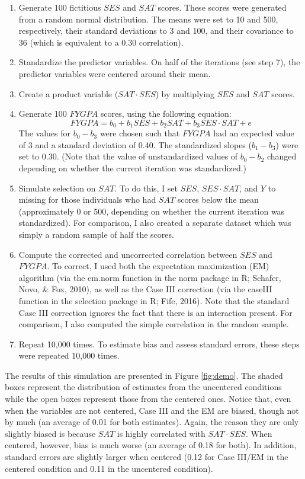 \documentclass[english,man]{apa6}
\providecommand{\tightlist}{%
  \setlength{\itemsep}{0pt}\setlength{\parskip}{0pt}}
\theoremstyle{definition}
\theoremstyle{definition}
\theoremstyle{remark}
\begin{document}
\begin{enumerate}
\def\labelenumi{(\arabic{enumi})}
\tightlist
\item
  Generate 100 fictitious \(SES\) and \(SAT\) scores. These scores were
  generated from a random normal distribution. The means were set to 10
  and 500, respectively, their standard deviations to 3 and 100, and
  their covariance to 36 (which is equivalent to a 0.30 correlation).
\item
  Standardize the predictor variables. On half of the iterations (see
  step 7), the predictor variables were centered around their mean.
\item
  Create a product variable (\(SAT\cdot SES\)) by multiplying \(SES\)
  and \(SAT\) scores.
\item
  Generate 100 \(FYGPA\) scores, using the following equation:
  \[ FYGPA = b_0 + b_1SES + b_2SAT + b_3SES\cdot SAT + e\] The values
  for \(b_0-b_3\) were chosen such that \(FYGPA\) had an expected value
  of 3 and a standard deviation of 0.40. The standardized slopes
  (\(b_1-b_3\)) were set to 0.30. (Note that the value of unstandardized
  values of \(b_0-b_2\) changed depending on whether the current
  iteration was standardized.)
\item
  Simulate selection on \(SAT\). To do this, I set \(SES\),
  \(SES\cdot SAT\), and \(Y\) to missing for those individuals who had
  \(SAT\) scores below the mean (approximately 0 or 500, depending on
  whether the current iteration was standardized). For comparison, I
  also created a separate dataset which was simply a random sample of
  half the scores.
\item
  Compute the corrected and uncorrected correlation between \(SES\) and
  \(FYGPA\). To correct, I used both the expectation maximization (EM)
  algorithm (via the em.norm function in the norm package in R; Schafer,
  Novo, \& Fox, 2010), as well as the Case III correction (via the
  caseIII function in the selection package in R; Fife, 2016). Note that
  the standard Case III correction ignores the fact that there is an
  interaction present. For comparison, I also computed the simple
  correlation in the random sample.
\item
  Repeat 10,000 times. To estimate bias and assess standard errors,
  these steps were repeated 10,000 times.
\end{enumerate}

The results of this simulation are presented in Figure \ref{fig:demo}.
The shaded boxes represent the distribution of estimates from the
uncentered conditions while the open boxes represent those from the
centered ones. Notice that, even when the variables are not centered,
Case III and the EM are biased, though not by much (an average of 0.01
for both estimates). Again, the reason they are only slightly biased is
because \(SAT\) is highly correlated with \(SAT\cdot SES\). When
centered, however, bias is much worse (an average of 0.18 for both). In
addition, standard errors are slightly larger when centered (0.12 for
Case III/EM in the centered condition and 0.11 in the uncentered
condition).
\end{document}
